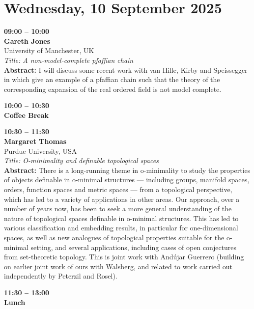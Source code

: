\documentclass[10pt,a4paper]{article}
\begin{document}
\section{Wednesday, 10 September 2025}
\begin{tcolorbox}[talkbox]
\textbf{09:00 -- 10:00} \\
\textbf{Gareth Jones} \\
University of Manchester, UK \\
\textit{Title: A non-model-complete pfaffian chain} \\
\textbf{Abstract:} I will discuss some recent work with van Hille, Kirby and Speissegger in which give an example of a pfaffian chain such that the theory of the corresponding expansion of the real ordered field is not model complete.
\end{tcolorbox}
\begin{tcolorbox}[talkbox]
\textbf{10:00 -- 10:30} \\
\textbf{Coffee Break} 
\end{tcolorbox}
\begin{tcolorbox}[talkbox]
\textbf{10:30 -- 11:30} \\
\textbf{Margaret Thomas} \\
Purdue University, USA \\
\textit{Title: O-minimality and definable topological spaces} \\
\textbf{Abstract:} There is a long-running theme in o-minimality to study the properties of objects definable in o-minimal structures — including groups, manifold spaces, orders, function spaces and metric spaces — from a topological perspective, which has led to a variety of applications in other areas. Our approach, over a number of years now, has been to seek a more general understanding of the nature of topological spaces definable in o-minimal structures. This has led to various classification and embedding results, in particular for one-dimensional spaces, as well as new analogues of topological properties suitable for the o-minimal setting, and several applications, including cases of open conjectures from set-theoretic topology. This is joint work with Andújar Guerrero (building on earlier joint work of ours with Walsberg, and related to work carried out independently by Peterzil and Rosel).
\end{tcolorbox}
\begin{tcolorbox}[talkbox]
\textbf{11:30 -- 13:00} \\
\textbf{Lunch}
\end{tcolorbox}
\end{document}
